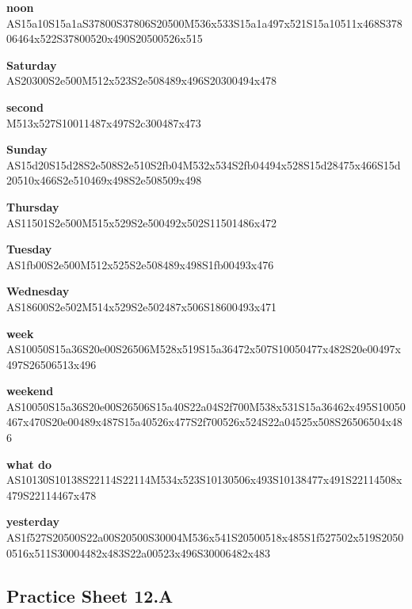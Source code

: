 \documentclass{article}
\begin{document}
\begin{glossary}
\textbf{noon}\\
AS15a10S15a1aS37800S37806S20500M536x533S15a1a497x521S15a10511x468S37806464x522S37800520x490S20500526x515

\textbf{Saturday}\\
AS20300S2e500M512x523S2e508489x496S20300494x478

\textbf{second}\\
M513x527S10011487x497S2c300487x473

\textbf{Sunday}\\
AS15d20S15d28S2e508S2e510S2fb04M532x534S2fb04494x528S15d28475x466S15d20510x466S2e510469x498S2e508509x498

\textbf{Thursday}\\
AS11501S2e500M515x529S2e500492x502S11501486x472

\textbf{Tuesday}\\
AS1fb00S2e500M512x525S2e508489x498S1fb00493x476

\textbf{Wednesday}\\
AS18600S2e502M514x529S2e502487x506S18600493x471

\textbf{week}\\
AS10050S15a36S20e00S26506M528x519S15a36472x507S10050477x482S20e00497x497S26506513x496

\textbf{weekend}\\
AS10050S15a36S20e00S26506S15a40S22a04S2f700M538x531S15a36462x495S10050467x470S20e00489x487S15a40526x477S2f700526x524S22a04525x508S26506504x486

\textbf{what do}\\
AS10130S10138S22114S22114M534x523S10130506x493S10138477x491S22114508x479S22114467x478

\textbf{yesterday}\\
AS1f527S20500S22a00S20500S30004M536x541S20500518x485S1f527502x519S20500516x511S30004482x483S22a00523x496S30006482x483

\end{glossary}

\subsection{Practice Sheet 12.A}
\end{document}
